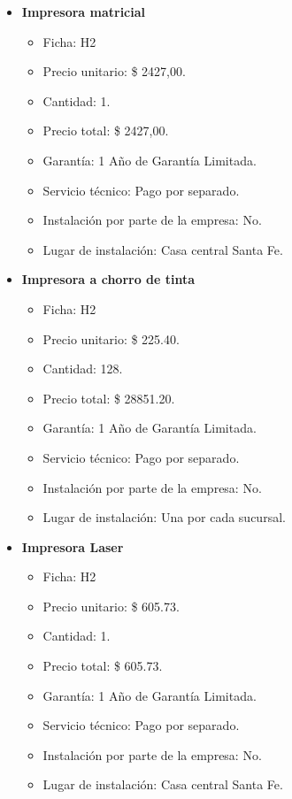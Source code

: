 \begin{itemize}
  \item \textbf{Impresora matricial}
    \begin{itemize}
      \item Ficha: H2
      \item Precio unitario: \$ 2427,00.
      \item Cantidad: 1.
      \item Precio total: \$ 2427,00.
      \item Garantía: 1 Año de Garantía Limitada.
      \item Servicio técnico: Pago por separado.
      \item Instalación por parte de la empresa: No.
      \item Lugar de instalación: Casa central Santa Fe.
    \end{itemize}
    
  \item \textbf{Impresora a chorro de tinta}
    \begin{itemize}
      \item Ficha: H2
      \item Precio unitario: \$ 225.40.
      \item Cantidad: 128.
      \item Precio total: \$ 28851.20.
      \item Garantía: 1 Año de Garantía Limitada.
      \item Servicio técnico: Pago por separado.
      \item Instalación por parte de la empresa: No.
      \item Lugar de instalación: Una por cada sucursal.
    \end{itemize}
    
  \item \textbf{Impresora Laser}
    \begin{itemize}
      \item Ficha: H2
      \item Precio unitario: \$ 605.73.
      \item Cantidad: 1.
      \item Precio total: \$ 605.73.
      \item Garantía: 1 Año de Garantía Limitada.
      \item Servicio técnico: Pago por separado.
      \item Instalación por parte de la empresa: No.
      \item Lugar de instalación: Casa central Santa Fe.
    \end{itemize}
\end{itemize}

